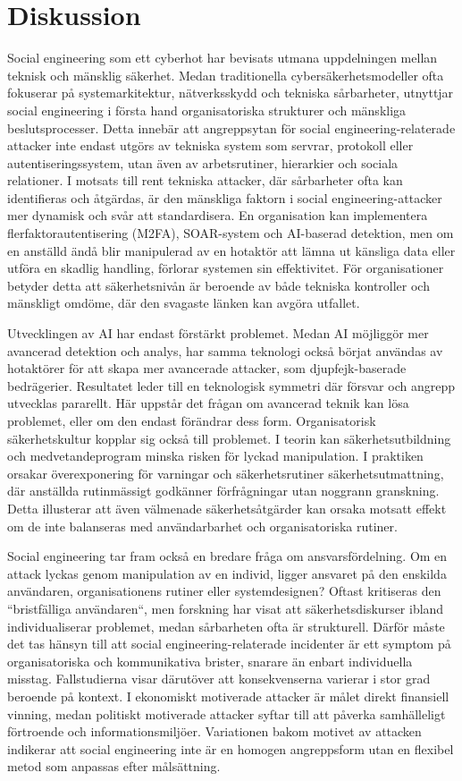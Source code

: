 \chapter{Diskussion}

Social engineering som ett cyberhot har bevisats utmana uppdelningen mellan teknisk och mänsklig säkerhet.
Medan traditionella cybersäkerhetsmodeller ofta fokuserar på systemarkitektur, nätverksskydd och tekniska sårbarheter,
utnyttjar social engineering i första hand organisatoriska strukturer och mänskliga beslutsprocesser.
Detta innebär att angreppsytan för social engineering-relaterade attacker inte endast utgörs av tekniska system som servrar,
protokoll eller autentiseringssystem, utan även av arbetsrutiner, hierarkier och sociala relationer. I motsats till rent tekniska attacker, där sårbarheter ofta kan identifieras och åtgärdas,
är den mänskliga faktorn i social engineering-attacker mer dynamisk och svår att standardisera. En organisation
kan implementera flerfaktorautentisering (M2FA), SOAR-system och AI-baserad detektion, men om en anställd ändå blir manipulerad av en hotaktör
att lämna ut känsliga data eller utföra en skadlig handling, förlorar systemen sin effektivitet. För organisationer betyder detta
att säkerhetsnivån är beroende av både tekniska kontroller och mänskligt omdöme, där den svagaste länken kan avgöra utfallet.

Utvecklingen av AI har endast förstärkt problemet. Medan AI möjliggör mer avancerad detektion och analys, har samma teknologi också börjat användas av hotaktörer
för att skapa mer avancerade attacker, som djupfejk-baserade bedrägerier. Resultatet leder till en teknologisk symmetri där försvar och angrepp utvecklas pararellt. 
Här uppstår det frågan om avancerad teknik kan lösa problemet, eller om den endast förändrar dess form. Organisatorisk säkerhetskultur kopplar sig också till problemet.
I teorin kan säkerhetsutbildning och medvetandeprogram minska risken för lyckad manipulation. I praktiken orsakar överexponering för varningar och säkerhetsrutiner säkerhetsutmattning,
där anställda rutinmässigt godkänner förfrågningar utan noggrann granskning. Detta illusterar att även välmenade säkerhetsåtgärder kan orsaka motsatt effekt om de inte balanseras med 
användarbarhet och organisatoriska rutiner.

Social engineering tar fram också en bredare fråga om ansvarsfördelning. Om en attack lyckas genom manipulation av en individ, ligger ansvaret på den enskilda användaren,
organisationens rutiner eller systemdesignen? Oftast kritiseras den ``bristfälliga användaren``, men forskning har visat att säkerhetsdiskurser ibland individualiserar problemet,
medan sårbarheten ofta är strukturell. Därför måste det tas hänsyn till att social engineering-relaterade incidenter är ett symptom på organisatoriska och kommunikativa brister,
snarare än enbart individuella misstag. Fallstudierna visar därutöver att konsekvenserna varierar i stor grad beroende på kontext. I ekonomiskt motiverade attacker är målet direkt
finansiell vinning, medan politiskt motiverade attacker syftar till att påverka samhälleligt förtroende och informationsmiljöer. Variationen bakom motivet av attacken indikerar att
social engineering inte är en homogen angreppsform utan en flexibel metod som anpassas efter målsättning.